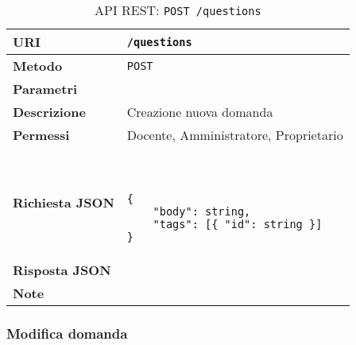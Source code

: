         \begin{table}[H]
            \begin{center}
                \begin{tabular}{p{} p{}}
                    \toprule
                    \textbf{URI} & \texttt{/questions} \\ \midrule
                    \textbf{Metodo} & \texttt{POST} \\ \midrule
                    \textbf{Parametri} & \\ \midrule
                    \textbf{Descrizione} & Creazione nuova domanda \\ \midrule
                    \textbf{Permessi} & Docente, Amministratore, Proprietario  \\ \midrule
                    \textbf{Richiesta JSON} & \
                        \begin{lstlisting}[basicstyle={\ttfamily}]
{
    "body": string,
    "tags": [{ "id": string }]
}
                        \end{lstlisting}
                        \\ \midrule
                    \textbf{Risposta JSON} & \\ \midrule
                    \textbf{Note} & \\
                    \bottomrule
                \end{tabular}
                \caption{API REST: \texttt{POST /questions}}
            \end{center}
        \end{table}

    \subsubsection{Modifica domanda}


